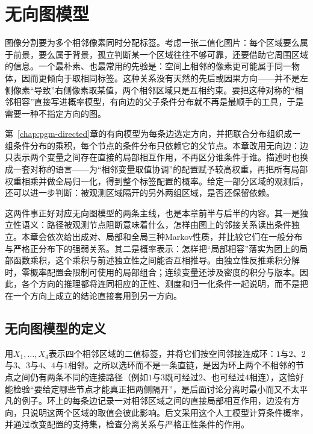 \chapter{无向图模型}
\label{chap:pgm-undirected}

图像分割要为多个相邻像素同时分配标签。考虑一张二值化图片：每个区域要么属于前景，要么属于背景，孤立判断某一个区域往往不够可靠，还要借助它周围区域的信息。一个最朴素、也最常用的先验是：空间上相邻的像素更可能属于同一物体，因而更倾向于取相同标签。这种关系没有天然的先后或因果方向——并不是左侧像素“导致”右侧像素取某值，两个相邻区域只是互相约束。要把这种对称的“相邻相容”直接写进概率模型，有向边的父子条件分布就不再是最顺手的工具，于是需要一种不指定方向的图。

第~\ref{chap:pgm-directed}章的有向模型为每条边选定方向，并把联合分布组织成一组条件分布的乘积，每个节点的条件分布只依赖它的父节点。本章改用无向边：边只表示两个变量之间存在直接的局部相互作用，不再区分谁条件于谁。描述时也换成一套对称的语言——为“相邻变量取值协调”的配置赋予较高权重，再把所有局部权重相乘并做全局归一化，得到整个标签配置的概率。给定一部分区域的观测后，还可以进一步判断：被观测区域隔开的另外两组区域，是否还保留依赖。

这两件事正好对应无向图模型的两条主线，也是本章前半与后半的内容。其一是独立性语义：路径被观测节点阻断意味着什么，怎样由图上的邻接关系读出条件独立。本章会依次给出成对、局部和全局三种Markov性质，并比较它们在一般分布与严格正分布下的强弱关系。其二是概率表示：怎样把“局部相容”落实为团上的局部函数乘积，这个乘积与前述独立性之间能否互相推导。由独立性反推乘积分解时，零概率配置会限制可使用的局部组合；连续变量还涉及密度的积分与版本。因此，各个方向的推理都将连同相应的正性、测度和归一化条件一起说明，而不是把在一个方向上成立的结论直接套用到另一方向。

\section{无向图模型的定义}
\label{sec:pgm-undirected-definition}

用$X_1,\ldots,X_4$表示四个相邻区域的二值标签，并将它们按空间邻接连成环：$1$与$2$、$2$与$3$、$3$与$4$、$4$与$1$相邻。之所以选环而不是一条直链，是因为环上两个不相邻的节点之间仍有两条不同的连接路径（例如$1$与$3$既可经过$2$、也可经过$4$相连），这恰好能检验“要给定哪些节点才能真正把两侧隔开”，是后面讨论分离时最小而又不太平凡的例子。环上的每条边记录一对相邻区域之间的直接局部相互作用，边没有方向，只说明这两个区域的取值会彼此影响。后文采用这个人工模型计算条件概率，并通过改变配置的支持集，检查分离关系与严格正性条件的作用。

